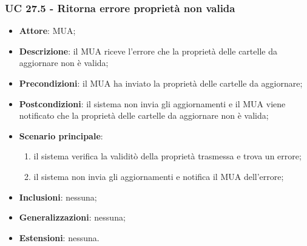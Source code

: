     \subsubsection{UC 27.5 - Ritorna errore proprietà non valida} \label{sec:UC27.5}
    \begin{itemize}
        \item \textbf{Attore}: MUA;
        \item \textbf{Descrizione}: il MUA riceve l'errore che la proprietà delle cartelle da aggiornare non è valida;
        \item \textbf{Precondizioni}: il MUA ha inviato la proprietà delle cartelle da aggiornare;
        \item \textbf{Postcondizioni}: il sistema non invia gli aggiornamenti e il MUA viene notificato che la proprietà delle cartelle da aggiornare non è valida;
        \item \textbf{Scenario principale}:
            \begin{enumerate}
                \item il sistema verifica la validitò della proprietà trasmessa e trova un errore;
                \item il sistema non invia gli aggiornamenti e notifica il MUA dell'errore;
            \end{enumerate}
        \item \textbf{Inclusioni}: nessuna;
        \item \textbf{Generalizzazioni}: nessuna;
        \item \textbf{Estensioni}: nessuna.
    \end{itemize}